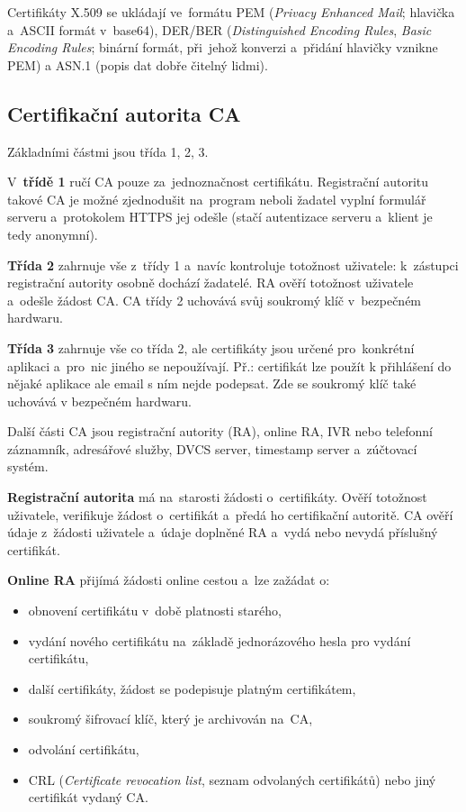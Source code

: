 Certifikáty X.509 se ukládají ve~formátu PEM (\emph{Privacy Enhanced Mail}; hlavička a~ASCII formát v~base64), DER/BER (\emph{Distinguished Encoding Rules}, \emph{Basic Encoding Rules}; binární formát, při~jehož konverzi a~přidání hlavičky vznikne PEM) a ASN.1 (popis dat dobře čitelný lidmi).

\subsection{Certifikační autorita CA}

Základními částmi jsou třída 1, 2, 3.

V~\textbf{třídě 1} ručí CA pouze za~jednoznačnost certifikátu. Registrační autoritu takové CA je možné zjednodušit na~program neboli žadatel vyplní formulář serveru a~protokolem HTTPS jej odešle (stačí autentizace serveru a~klient je tedy anonymní).

\textbf{Třída 2} zahrnuje vše z~třídy 1 a~navíc kontroluje totožnost uživatele: k~zástupci registrační autority osobně dochází žadatelé. RA ověří totožnost uživatele a~odešle žádost CA. CA třídy 2 uchovává svůj soukromý klíč v~bezpečném hardwaru.

\textbf{Třída 3} zahrnuje vše co třída 2, ale certifikáty jsou určené pro~konkrétní aplikaci a~pro~nic jiného se nepoužívají. Př.: certifikát lze použít k přihlášení do nějaké aplikace ale email s ním nejde podepsat. Zde se soukromý klíč také uchovává v bezpečném hardwaru.

Další části CA jsou registrační autority (RA), online RA, IVR nebo telefonní záznamník, adresářové služby, DVCS server, timestamp server a~zúčtovací systém.

\textbf{Registrační autorita} má na~starosti žádosti o~certifikáty. Ověří totožnost uživatele, verifikuje žádost o~certifikát a~předá ho certifikační autoritě. CA ověří údaje z~žádosti uživatele a~údaje doplněné RA a~vydá nebo nevydá příslušný certifikát.
 
\textbf{Online RA} přijímá žádosti online cestou a~lze zažádat o:
\begin{itemize}
    \item obnovení certifikátu v~době platnosti starého,
    \item vydání nového certifikátu na~základě jednorázového hesla pro vydání~ certifikátu,
    \item další certifikáty, žádost se podepisuje platným certifikátem,
    \item soukromý šifrovací klíč, který je archivován na~CA,
    \item odvolání certifikátu,
    \item CRL (\emph{Certificate revocation list}, seznam odvolaných certifikátů) nebo jiný certifikát vydaný CA.
\end{itemize}

